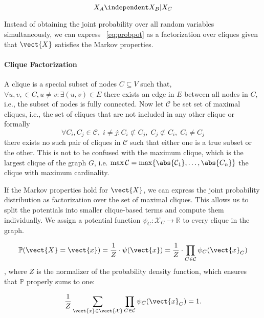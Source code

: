 \begin{equation}
    X_A \independent X_B \lvert X_C
\end{equation}

Instead of obtaining the joint probability over all random variables simultaneously, we can express \eq~\ref{eq:probpot} as a factorization over cliques given that $\vect{X}$ satisfies the Markov properties. 

\paragraph*{Clique Factorization}

A clique is a special subset of nodes $C \subseteq V$ such that, $\forall u,v,  \in C, u \neq v: \exists (u,v) \in E$ there exists an edge in $E$ between all nodes in $C$, i.e., the subset of nodes is fully connected.
Now let $\mathcal{C}$ be set set of maximal cliques, i.e., the set of cliques that are not included in any other clique or formally 
\begin{equation}
    \forall C_i, C_j \in \mathcal{C},\; i \neq j  : C_i \not\subset C_j,\; C_j \not\subset C_i,\; C_i \neq C_j
\end{equation}
there exists no such pair of cliques in $\mathcal{C}$ such that either one is a true subset or the other.
This is not to be confused with the maximum clique, which is the largest clique of the graph $G$, i.e. $\max \mathcal{C} = \max \{\abs{\mathcal{C}_1}, \ldots, \abs{C_n}\}$ the clique with maximum cardinality.

If the Markov properties hold for $\vect{X}$, we can express the joint probability distribution as factorization over the set of maximal cliques.
This allows us to split the potentials into smaller clique-based terms and compute them individually. 
We assign a potential function $\psi_C: \mathcal{X}_C \rightarrow \mathbb{R}$ to every clique in the graph.

\begin{equation}
        \mathbb{P}(\vect{X}=\vect{x}) = \frac{1}{Z} \cdot \psi(\vect{x})= \frac{1}{Z} \cdot \prod_{C \in \mathcal{C}} \psi_C(\vect{x}_C)
\end{equation},
where $Z$ is the normalizer of the probability density function, which ensures that $\mathbb{P}$  properly sums to one:

\begin{equation}
    \frac{1}{Z} \sum_{\vect{x}\in \mathcal{\vect{X}}} \prod_{C \in \mathcal{C}} \psi_C(\vect{x}_C) = 1. 
\end{equation}

